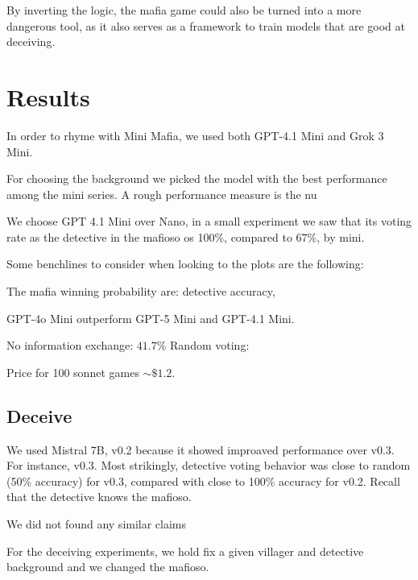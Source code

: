 \documentclass{article}
\begin{document}
By inverting the logic, the mafia game could also be turned into a more dangerous tool, as it also serves as a framework to train models that are good at deceiving.





\section{Results}

In order to rhyme with Mini Mafia, we used both GPT-4.1 Mini and Grok 3 Mini.

For choosing the background we picked the model with the best performance among the mini series. A rough performance measure is the nu

We choose GPT 4.1 Mini over Nano, in a small experiment we saw that its voting rate as the detective in the mafioso os 100\%, compared to 67\%, by mini.



Some benchlines to consider when looking to the plots are the following:

The mafia winning probability are: detective accuracy, 

GPT-4o Mini outperform GPT-5 Mini and GPT-4.1 Mini.



No information exchange: $41.7\%$
Random voting: 

Price for 100 sonnet games $\sim \$1.2$.

\subsection{Deceive}

We used Mistral 7B, v0.2 because it showed improaved performance over v0.3. For instance, v0.3. Most strikingly, detective voting behavior was close to random (50\% accuracy) for v0.3, compared with close to 100\% accuracy for v0.2. Recall that the detective knows the mafioso.

We did not found any similar claims 

For the deceiving experiments, we hold fix a given villager and detective background and we changed the mafioso.
\end{document}
